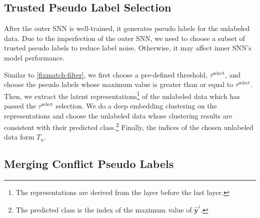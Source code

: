 \documentclass{article}
\def\by{{\boldsymbol y}}
\begin{document}

\subsection{Trusted Pseudo Label Selection}
\label{subsec:outer-trust-selection}

After the outer SNN is well-trained, it generates pseudo labels for the unlabeled data.
Due to the imperfection of the outer SNN, we need to choose a subset of trusted pseudo labels to reduce label noise.
Otherwise, it may affect inner SNN's model performance.

Similar to \eqref{fixmatch-filter}, we first choose a pre-defined threshold, $\tau^{\text{select}}$, and choose the pseudo labels whose maximum value is greater than or equal to $\tau^{\text{select}}$.
Then, we extract the latent representations\footnote{
The representations are derived from the layer before the last layer.
}
of the unlabeled data which has passed the $\tau^{\text{select}}$ selection.
We do a deep embedding clustering \cite{JX16a, XY21a} on the representations and
choose the unlabeled data whose clustering results are consistent with their predicted class.\footnote{
    The predicted class is the index of the maximum value of $\hat{\by}^i$.    
}
Finally, the indices of the chosen unlabeled data form $T_u$.

\subsection{Merging Conflict Pseudo Labels}
\label{subsec:heuristic-teacher-student}
\end{document}

